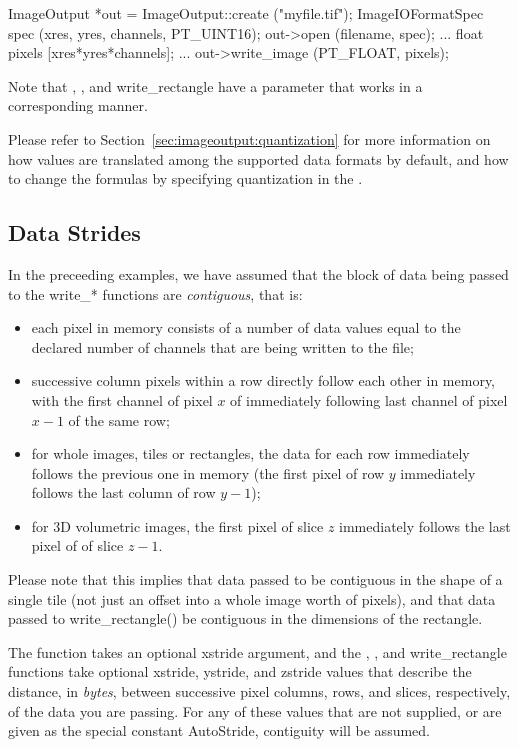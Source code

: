 \begin{code}
        ImageOutput *out = ImageOutput::create ("myfile.tif");
        ImageIOFormatSpec spec (xres, yres, channels, PT_UINT16);
        out->open (filename, spec);
        ...
        float pixels [xres*yres*channels];
        ...
        out->write_image (PT_FLOAT, pixels);
\end{code}

\noindent Note that \writescanline, \writetile, and {\cf
  write_rectangle} have a parameter that works in a corresponding
manner.

Please refer to Section~\ref{sec:imageoutput:quantization} for more
information on how values are translated among the supported data
formats by default, and how to change the formulas by specifying
quantization in the \ImageIOFormatSpec.


\subsection{Data Strides}
\label{sec:imageoutput:strides}

In the preceeding examples, we have assumed that the block of data being
passed to the {\cf write_*} functions are \emph{contiguous}, that is:

\begin{itemize}
\item each pixel in memory consists of a number of data values equal to
  the declared number of channels that are being written to the file;
\item successive column pixels within a row directly follow each other in
  memory, with the first channel of pixel $x$ of immediately following
  last channel of pixel $x-1$ of the same row;
\item for whole images, tiles or rectangles, the data for each row
  immediately follows the previous one in memory (the first pixel of row
  $y$ immediately follows the last column of row $y-1$);
\item for 3D volumetric images, the first pixel of slice $z$ immediately
  follows the last pixel of of slice $z-1$.
\end{itemize}

Please note that this implies that data passed to
\writetile be contiguous in the shape of a single tile (not just an
offset into a whole image worth of pixels), and that data passed to {\cf
  write_rectangle()} be contiguous in the dimensions of the rectangle.

The \writescanline function takes an optional {\cf xstride} argument,
and the \writeimage, \writetile, and {\cf write_rectangle} functions
take optional {\cf xstride}, {\cf ystride}, and {\cf zstride} values
that describe the distance, in \emph{bytes}, between successive pixel
columns, rows, and slices, respectively, of the data you are passing.
For any of these values that are not supplied, or are given as the
special constant {\cf AutoStride}, contiguity will be assumed.

